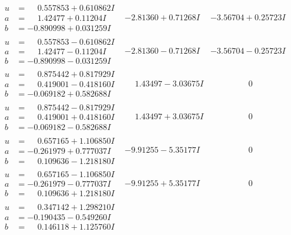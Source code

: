 \documentclass[1p]{elsarticle_modified}
\theoremstyle{definition}
\begin{document}
$$\begin{array}{c|c|c}
\begin{aligned}
u &= \phantom{-}0.557853 + 0.610862 I \\
a &= \phantom{-}1.42477 + 0.11204 I \\
b &= -0.890998 + 0.031259 I\end{aligned}
 & -2.81360 + 0.71268 I & -3.56704 + 0.25723 I \\ \hline\begin{aligned}
u &= \phantom{-}0.557853 - 0.610862 I \\
a &= \phantom{-}1.42477 - 0.11204 I \\
b &= -0.890998 - 0.031259 I\end{aligned}
 & -2.81360 - 0.71268 I & -3.56704 - 0.25723 I \\ \hline\begin{aligned}
u &= \phantom{-}0.875442 + 0.817929 I \\
a &= \phantom{-}0.419001 - 0.418160 I \\
b &= -0.069182 + 0.582688 I\end{aligned}
 & \phantom{-}1.43497 - 3.03675 I & \phantom{-0.000000 } 0 \\ \hline\begin{aligned}
u &= \phantom{-}0.875442 - 0.817929 I \\
a &= \phantom{-}0.419001 + 0.418160 I \\
b &= -0.069182 - 0.582688 I\end{aligned}
 & \phantom{-}1.43497 + 3.03675 I & \phantom{-0.000000 } 0 \\ \hline\begin{aligned}
u &= \phantom{-}0.657165 + 1.106850 I \\
a &= -0.261979 + 0.777037 I \\
b &= \phantom{-}0.109636 - 1.218180 I\end{aligned}
 & -9.91255 - 5.35177 I & \phantom{-0.000000 } 0 \\ \hline\begin{aligned}
u &= \phantom{-}0.657165 - 1.106850 I \\
a &= -0.261979 - 0.777037 I \\
b &= \phantom{-}0.109636 + 1.218180 I\end{aligned}
 & -9.91255 + 5.35177 I & \phantom{-0.000000 } 0 \\ \hline\begin{aligned}
u &= \phantom{-}0.347142 + 1.298210 I \\
a &= -0.190435 - 0.549260 I \\
b &= \phantom{-}0.146118 + 1.125760 I\end{aligned}

\end{array}$$
\end{document}

